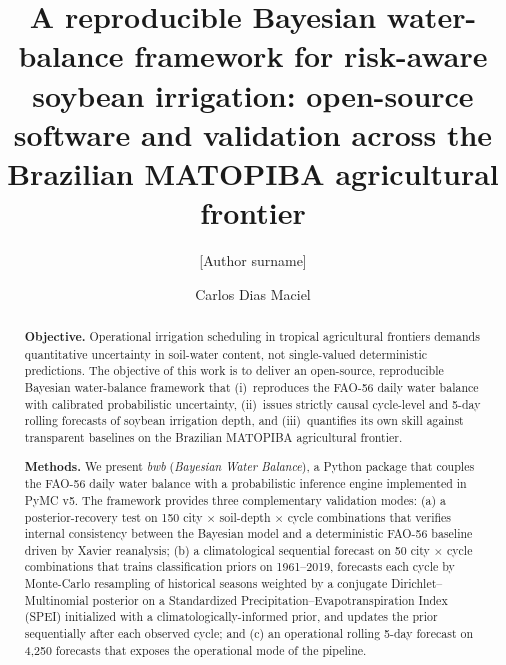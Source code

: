 \documentclass[review,5p,times]{elsarticle}
\begin{document}
\begin{frontmatter}

\title{A reproducible Bayesian water-balance framework for risk-aware
soybean irrigation: open-source software and validation across the
Brazilian MATOPIBA agricultural frontier}

\author[1,2]{[Author surname]}

\author[3]{Carlos Dias Maciel}



\begin{abstract}
\textbf{Objective.} Operational irrigation scheduling in tropical
agricultural frontiers demands quantitative uncertainty in
soil-water content, not single-valued deterministic predictions. The
objective of this work is to deliver an open-source, reproducible
Bayesian water-balance framework that (i)~reproduces the FAO-56
daily water balance with calibrated probabilistic uncertainty,
(ii)~issues strictly causal cycle-level and 5-day rolling forecasts
of soybean irrigation depth, and (iii)~quantifies its own skill
against transparent baselines on the Brazilian MATOPIBA agricultural
frontier.

\textbf{Methods.} We present \emph{bwb} (\emph{Bayesian Water
Balance}), a Python package that couples the FAO-56 daily water
balance with a probabilistic inference engine implemented in PyMC
v5. The framework provides three complementary validation modes:
(a) a posterior-recovery test on 150 city $\times$ soil-depth
$\times$ cycle combinations that verifies internal consistency
between the Bayesian model and a deterministic FAO-56 baseline
driven by Xavier reanalysis; (b) a climatological sequential
forecast on 50 city $\times$ cycle combinations that trains
classification priors on 1961--2019, forecasts each cycle by
Monte-Carlo resampling of historical seasons weighted by a
conjugate Dirichlet--Multinomial posterior on a Standardized
Precipitation--Evapotranspiration Index (SPEI) initialized with a
climatologically-informed prior, and updates the prior sequentially
after each observed cycle; and (c) an operational rolling 5-day
forecast on 4{,}250 forecasts that exposes the operational mode of
the pipeline.


\end{abstract}
\end{frontmatter}
\end{document}
